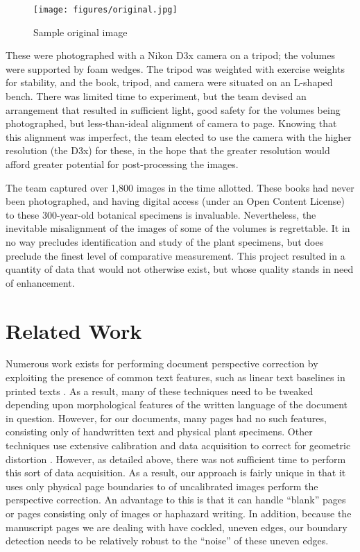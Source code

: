 \documentclass[runningheads,a4paper]{llncs}
\begin{document}
\begin{figure}[!htbm]
  \texttt{[image: figures/original.jpg]}
  \caption{Sample original image}\label{fig:original}
\end{figure}

\clearpage

These were photographed with a Nikon D3x camera on a tripod; the volumes were supported by foam wedges. The tripod was weighted with exercise weights for stability, and the book, tripod, and camera were situated on an L-shaped bench. There was limited time to experiment, but the team devised an arrangement that resulted in sufficient light, good safety for the volumes being photographed, but less-than-ideal alignment of camera to page. Knowing that this alignment was imperfect, the team elected to use the camera with the higher resolution (the D3x) for these, in the hope that the greater resolution would afford greater potential for post-processing the images.

The team captured over 1,800 images in the time allotted. These books had never been photographed, and having digital access (under an Open Content License) to these 300-year-old botanical specimens is invaluable. Nevertheless, the inevitable misalignment of the images of some of the volumes is regrettable. It in no way precludes identification and study of the plant specimens, but does preclude the finest level of comparative measurement. This project resulted in a quantity of data that would not otherwise exist, but whose quality stands in need of enhancement.

\section{Related Work}

Numerous work exists for performing document perspective correction by exploiting the presence of
common text features, such as linear text baselines in printed texts
\cite{Clark:2001vj,Clark:2002wk,Clark:2003wf,Cao:2003bh,Lu:2003jy,Zhang:2005dy,Monnier:2005jj,Liang:2005hc,Ulges:2005ju,Ezaki:2005jc,Pollard:2005bp,Lu:2005ih,Avila:2005jx,Zhang:2008kj,JianLiang:2008ew,Bukhari:2009tc,Beusekom:2010dg,Luo:2011go,Rahnemoonfar:2011ux,Golpardaz:2011dz,Yang:2011dt}.
As a result, many of these techniques need to be tweaked depending upon morphological features of
the written language of the document in question.
However, for our documents,
many pages had no such features, consisting only of handwritten text and physical plant
specimens.
Other techniques use extensive calibration and data acquisition to correct for geometric distortion 
\cite{Pilu:vr,Brown:2001td,Brown:2004vl,Brown:2005uy,Brown:2007ti,LiZhang:2008bp}.
However, as detailed above, there was not sufficient time to perform this sort of data acquisition.
As a result, our approach is fairly unique in that it uses only physical page boundaries to of uncalibrated images
perform the perspective correction. An advantage to this is that it can handle “blank” pages or pages
consisting only of images or haphazard writing. In addition, because the manuscript pages we are dealing with have
cockled, uneven edges, our boundary detection needs to be relatively robust to the “noise” of these uneven edges.
\end{document}

